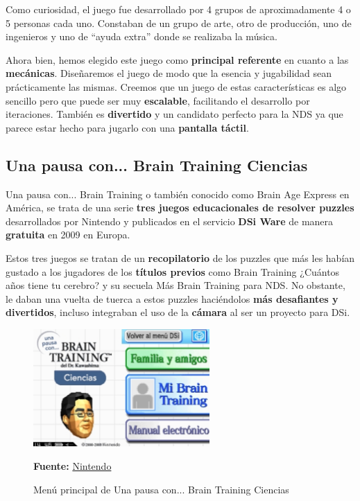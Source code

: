 Como curiosidad, el juego fue desarrollado por 4 grupos de aproximadamente 4 o 5 personas cada uno. Constaban de un grupo de arte, otro de producción, uno de ingenieros y uno de ``ayuda extra'' donde se realizaba la música.

\vspace{0.5cm}

Ahora bien, hemos elegido este juego como \textbf{principal referente} en cuanto a las \textbf{mecánicas}. Diseñaremos el juego de modo que la esencia y jugabilidad sean prácticamente las mismas. Creemos que un juego de estas características es algo sencillo pero que puede ser muy\textbf{ escalable}, facilitando el desarrollo por iteraciones. También es\textbf{ divertido} y un candidato perfecto para la NDS ya que parece estar hecho para jugarlo con una \textbf{pantalla táctil}.

\vspace{1cm}

\subsection{Una pausa con... Brain Training Ciencias}

Una pausa con... Brain Training o también conocido como Brain Age Express en América, se trata de una serie \textbf{tres juegos educacionales de resolver puzzles} desarrollados por Nintendo y publicados en el servicio \textbf{DSi Ware} de manera \textbf{gratuita} en 2009 en Europa.

\vspace{0.5cm}

Estos tres juegos se tratan de un \textbf{recopilatorio} de los puzzles que más les habían gustado a los jugadores de los \textbf{títulos previos} como Brain Training ¿Cuántos años tiene tu cerebro? y su secuela Más Brain Training para NDS. No obstante, le daban una vuelta de tuerca a estos puzzles haciéndolos \textbf{más desafiantes y divertidos}, incluso integraban el uso de la \textbf{cámara} al ser un proyecto para DSi.

\clearpage

\begin{figure}[htbp]
\centering
  \includegraphics[width=0.6\textwidth]{archivos/brain.png}
  \caption{Menú principal de Una pausa con... Brain Training Ciencias}
  \textbf{Fuente:} \href{https://www.nintendo.es/Juegos/Nintendo-DSiWare/Una-pausa-con-Brain-Training-Ciencias-261960.html}{Nintendo}
  \label{fig:sbraintraining1}
\end{figure}

